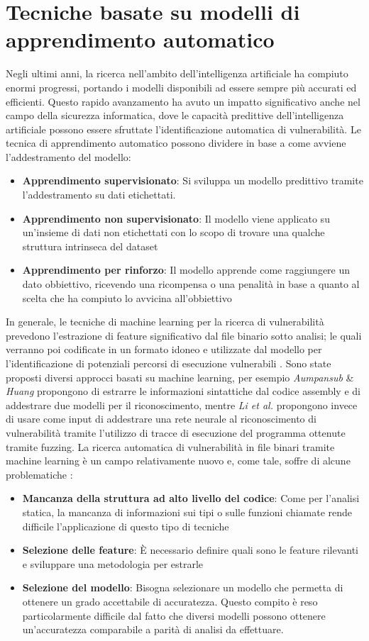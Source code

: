 \documentclass[../main.tex]{subfiles}
\begin{document}
\section{Tecniche basate su modelli di apprendimento automatico}
Negli ultimi anni, la ricerca nell'ambito dell'intelligenza artificiale ha compiuto enormi progressi, portando i modelli disponibili ad essere
sempre più accurati ed efficienti. Questo rapido avanzamento ha avuto un impatto significativo anche nel campo della sicurezza informatica, dove
le capacità predittive dell'intelligenza artificiale possono essere sfruttate l'identificazione automatica di vulnerabilità.
Le tecnica di apprendimento automatico possono dividere in base a come avviene l'addestramento del modello:
\begin{itemize}
    \item \textbf{Apprendimento supervisionato}: Si sviluppa un modello predittivo tramite l'addestramento su dati etichettati.
    \item \textbf{Apprendimento non supervisionato}: Il modello viene applicato su un'insieme di dati non etichettati con lo scopo di trovare una qualche struttura intrinseca del dataset
    \item \textbf{Apprendimento per rinforzo}: Il modello apprende come raggiungere un dato obbiettivo, ricevendo una ricompensa o una penalità in base a quanto al scelta che ha compiuto lo avvicina all'obbiettivo
\end{itemize}
In generale, le tecniche di machine learning per la ricerca di vulnerabilità prevedono l'estrazione di feature significativo dal file binario sotto analisi; le quali verranno poi codificate in un formato idoneo e utilizzate
dal modello per l'identificazione di potenziali percorsi di esecuzione vulnerabili \cite{ML_Survey}.
Sono state proposti diversi approcci basati su machine learning, per esempio \textit{Aumpansub} \& \textit{Huang} \cite{ML1} propongono di estrarre le informazioni sintattiche dal codice assembly e di addestrare
due modelli per il riconoscimento, mentre \textit{Li et al.} \cite{DeepVL} propongono invece di usare come input di addestrare una rete neurale al riconoscimento di vulnerabilità tramite l'utilizzo di tracce di esecuzione del programma ottenute tramite fuzzing.
La ricerca automatica di vulnerabilità in file binari tramite machine learning è un campo relativamente nuovo e, come tale, soffre di alcune problematiche \cite{ML2}:
\begin{itemize}
    \item \textbf{Mancanza della struttura ad alto livello del codice}: Come per l'analisi statica, la mancanza di informazioni sui tipi o sulle funzioni chiamate rende difficile l'applicazione di questo tipo di tecniche
    \item \textbf{Selezione delle feature}: È necessario definire quali sono le feature rilevanti e sviluppare una metodologia per estrarle
    \item \textbf{Selezione del modello}: Bisogna selezionare un modello che permetta di ottenere un grado accettabile di accuratezza. Questo compito è reso particolarmente difficile dal fatto che diversi modelli possono ottenere un'accuratezza comparabile a parità di analisi da effettuare.  
\end{itemize}
\end{document}
